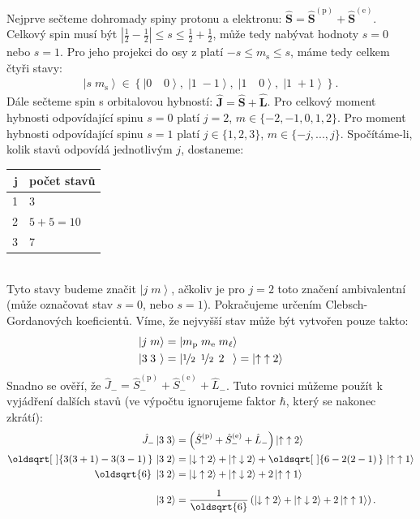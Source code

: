 \documentclass[10pt,a4paper]{article}
\renewcommand*{\sqrt}[2][\ ]{\oldsqrt[#1]{#2\,}\,}
\def\ph{\phantom}
\def\rzw{\mathrlap}
\def\+{+\!\!}
\def\-{-\!\!}
\newcommand{\const}[1]{\text{#1}}
\newcommand{\ket}[1]{\left| #1 \right>}
\newcommand{\bhat}[1]{\hat{\bm{#1}}}
\begin{document}
Nejprve sečteme dohromady spiny protonu a elektronu: $\bhat{S} = \bhat{S}^{(\const{p})} + \bhat{S}^{(\const{e})}$. Celkový spin musí být $\left| \frac{1}{2} - \frac{1}{2} \right| \leq s \leq \frac{1}{2} + \frac{1}{2}$, může tedy nabývat hodnoty $s=0$ nebo $s=1$. Pro jeho projekci do osy z platí $-s \leq m_\const{s} \leq s$, máme tedy celkem čtyři stavy:
\begin{gather*}
    \ket{s \; m_\const{s}} \in \left\{
        \ket{0 \; \ph{\+} 0}, \;
        \ket{1 \; \- 1}, \;
        \ket{1 \; \ph{\+} 0}, \;
        \ket{1 \; \+ 1}
    \right\}.
\end{gather*}
Dále sečteme spin s orbitalovou hybností: $\bhat{J} = \bhat{S} + \bhat{L}$. Pro celkový moment hybnosti odpovídající spinu $s=0$ platí $j=2$, $m \in \{-2, -1, 0, 1, 2\}$. Pro moment hybnosti odpovídající spinu $s=1$ platí $j \in \{1, 2, 3\}$, $m \in \{-j, ..., j\}$. Spočítáme-li, kolik stavů odpovídá jednotlivým $j$, dostaneme:
\begin{table}[!ht]
    \centering
    \begin{tabular}{ r|l }
        $\bm{j}$ &
        \bfseries počet stavů \\\hline
        1 & 3 \\
        2 & $5 + 5 = 10$ \\
        3 & 7
    \end{tabular}
\end{table}
\\
Tyto stavy budeme značit $\ket{j \; m}$, ačkoliv je pro $j=2$ toto značení ambivalentní (může označovat stav $s=0$, nebo $s=1$). Pokračujeme určením Clebsch-Gordanových koeficientů. Víme, že nejvyšší stav může být vytvořen pouze takto:
\begin{align*}
    \ket{j \; m} &= \ket{m_\const{p} \; m_\const{e} \; m_\ell} \\
    \ket{ \rzw{3}\ph{j} \; \rzw{3}\ph{m} } &= \ket{ \rzw{\nicefrac{1}{2}} \ph{m_p} \; \rzw{\nicefrac{1}{2}} \ph{m_e} \; \rzw{2} \ph{m_\ell} }
    = \ket{\uparrow \; \uparrow 2}
\end{align*}
Snadno se ověří, že $\hat{J}_{-} = \hat{S}_{-}^{(\const{p})} + \hat{S}_{-}^{(\const{e})} + \hat{L}_{-}$. Tuto rovnici můžeme použít k vyjádření dalších stavů (ve výpočtu ignorujeme faktor $\hbar$, který se nakonec zkrátí):
\begin{align*}
    \hat{J}_{-} \ket{3 \; 3} &= \left( \hat{S}_{-}^{(\const{p})} + \hat{S}_{-}^{(\const{e})} + \hat{L}_{-} \right) \ket{ \uparrow \; \uparrow 2}\\
    \sqrt{3 (3+1) - 3 (3-1)} \ket{3 \; 2} &= \ket{\downarrow \; \uparrow 2} + \ket{\uparrow \; \downarrow 2} + \sqrt{6 - 2(2-1)} \ket{\uparrow \; \uparrow 1} \\
    \oldsqrt{6} \; \ket{3 \; 2} &= \ket{\downarrow \; \uparrow 2} + \ket{\uparrow \; \downarrow 2} + 2 \ket{\uparrow \; \uparrow 1} \\[5pt]
    \ket{ 3 \; 2 } &= \frac{1}{\oldsqrt{6}} \left( \ket{\downarrow \; \uparrow 2} + \ket{\uparrow \; \downarrow 2} + 2 \ket{\uparrow \; \uparrow 1} \right).
\end{align*}
\end{document}
